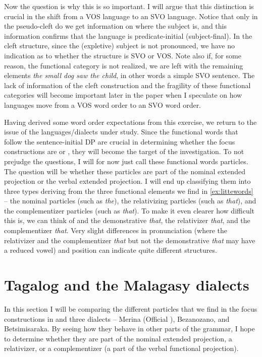 \documentclass[output=paper]{langsci/langscibook}
\begin{document}
Now the question is why this is so important.  I will argue that this
distinction is crucial in the shift from a VOS language to an SVO language.
Notice that only in the pseudo-cleft do we get information on where the subject
is, and this information confirms that the language is predicate-initial
(subject-final).  In the cleft structure, since the (expletive) subject is not
pronounced, we have no indication as to whether the structure is SVO or VOS.
Note also if, for some reason, the functional category is not realized, we are
left with the remaining elements \emph{the small dog saw the child}, in other
words a simple SVO sentence. The lack of information of the cleft construction
and the fragility of these functional categories will become important later in
the paper when I speculate on how languages move from a VOS word order to an
SVO word order.

 Having derived some word order expectations from this exercise,  we return to
 the issue of the languages/dialects under study.  Since the functional words
 that follow the sentence-initial DP are crucial in determining whether the
 focus constructions are  or , they will become the target
 of the investigation. To not prejudge the questions, I will for now just call
 these functional words particles.  The question will be whether these
 particles are part of the nominal extended projection or the verbal extended
 projection.  I will end up classifying them into three types deriving from the
 three functional elements we find in \eqref{ex:littewords} -- the nominal
 particles (such as \emph{the}), the relativizing particles (such as
 \emph{that}), and the complementizer particles (such as \emph{that}).  To make
 it even clearer how difficult this is, we can think of  and the
 demonstrative \emph{that}, the relativizer \emph{that}, and the complementizer
 \emph{that}.  Very slight differences in pronunciation (where the relativizer
 and the complementizer \emph{that} but not the demonstrative \emph{that} may
 have a reduced vowel) and position can indicate quite different structures.

\section{Tagalog and the Malagasy dialects}

In this section I will be comparing the different particles that we find in the
focus constructions in  and three  dialects --
Merina (Official ), Bezanozano, and Betsimisaraka.  By seeing how they
behave in other parts of the grammar, I hope to  determine whether they are
part of the nominal extended projection, a relativizer, or a complementizer
(a part of the verbal functional projection).
\end{document}
